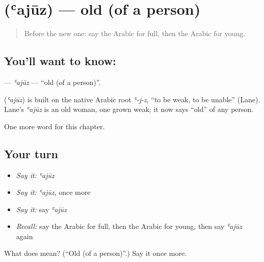 \section[\texorpdfstring{\ar{عجوز} (ʿajūz)}{عجوز (ʿajūz)}]{ (ʿajūz) — old (of a person)}

\label{lesson:AR-C154-ajuz}



\begin{quote}
Before the new one: say the Arabic for full, then the Arabic for young.
\end{quote}

\subsection*{You'll want to know: }
\textbf{} — \emph{ʿajūz} — \textquotedblleft{}old (of a person)\textquotedblright{}.

\begin{cousinweb}
\textbf{} (\emph{ʿajūz}) is built on the native Arabic root \emph{ʿ-j-z}, \textquotedblleft{}to be weak, to be unable\textquotedblright{} (Lane). Lane's \emph{ʿajūz} is an old woman, one grown weak; it now says \textquotedblleft{}old\textquotedblright{} of any person.
\end{cousinweb}

\begin{grammarlens}[title={What you've built}]
One more word for this chapter.
\end{grammarlens}

\subsection*{Your turn}
\begin{itemize}
\raggedright
  \item \emph{Say it:} \emph{ʿajūz}
  \item \emph{Say it:} \emph{ʿajūz}, once more
  \item \emph{Say it:} say \emph{ʿajūz}
  \item \emph{Recall:} say the Arabic for full, then the Arabic for young, then say \emph{ʿajūz} again
\end{itemize}

\begin{tcolorbox}[breakable,colback=teal!4,colframe=teal!35!black,title={Before you move on}]
What does  mean? (\textquotedblleft{}Old (of a person)\textquotedblright{}.) Say it once more.
\end{tcolorbox}
